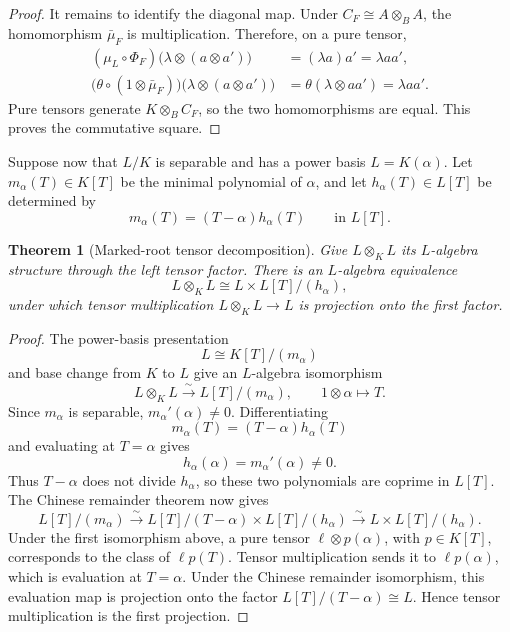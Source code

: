 \documentclass[11pt]{article}
\newtheorem{theorem}{Theorem}[section]
\theoremstyle{remark}
\theoremstyle{definition}
\begin{document}
\begin{proof}
It remains to identify the diagonal map.  Under
\(C_F\cong A\otimes_BA\), the homomorphism \(\bar\mu_F\) is
multiplication.  Therefore, on a pure tensor,
\[
  \begin{aligned}
  (\mu_L\circ\Phi_F)
    \bigl(\lambda\otimes(a\otimes a')\bigr)
    &=(\lambda a)a'
     =\lambda aa',\\
  \bigl(\theta\circ(1\otimes\bar\mu_F)\bigr)
    \bigl(\lambda\otimes(a\otimes a')\bigr)
    &=\theta(\lambda\otimes aa')
     =\lambda aa'.
  \end{aligned}
\]
Pure tensors generate \(K\otimes_BC_F\), so the two homomorphisms are
equal.  This proves the commutative square.
\end{proof}

Suppose now that \(L/K\) is separable and has a power basis
\(L=K(\alpha)\).  Let \(m_\alpha(T)\in K[T]\) be the minimal polynomial
of \(\alpha\), and let \(h_\alpha(T)\in L[T]\) be determined by
\[
  m_\alpha(T)=(T-\alpha)h_\alpha(T)
  \qquad\text{in }L[T].
\]

\begin{theorem}[Marked-root tensor decomposition]
\label{thm:marked-root-tensor-decomposition}
Give \(L\otimes_KL\) its \(L\)-algebra structure through the left tensor
factor.  There is an \(L\)-algebra equivalence
\[
  L\otimes_KL
  \cong
  L\times L[T]/(h_\alpha),
\]
under which tensor multiplication \(L\otimes_KL\to L\) is projection
onto the first factor.
\end{theorem}

\begin{proof}
The power-basis presentation
\[
  L\cong K[T]/(m_\alpha)
\]
and base change from \(K\) to \(L\) give an \(L\)-algebra isomorphism
\[
  L\otimes_KL
  \xrightarrow{\sim}
  L[T]/(m_\alpha),
  \qquad
  1\otimes\alpha\longmapsto T.
\]
Since \(m_\alpha\) is separable,
\(m_\alpha'(\alpha)\neq0\).  Differentiating
\[
  m_\alpha(T)=(T-\alpha)h_\alpha(T)
\]
and evaluating at \(T=\alpha\) gives
\[
  h_\alpha(\alpha)=m_\alpha'(\alpha)\neq0.
\]
Thus \(T-\alpha\) does not divide \(h_\alpha\), so these two polynomials
are coprime in \(L[T]\).  The Chinese remainder theorem now gives
\[
  L[T]/(m_\alpha)
  \xrightarrow{\sim}
  L[T]/(T-\alpha)\times L[T]/(h_\alpha)
  \xrightarrow{\sim}
  L\times L[T]/(h_\alpha).
\]
Under the first isomorphism above, a pure tensor
\(\ell\otimes p(\alpha)\), with \(p\in K[T]\), corresponds to the class
of \(\ell p(T)\).  Tensor multiplication sends it to
\(\ell p(\alpha)\), which is evaluation at \(T=\alpha\).  Under the
Chinese remainder isomorphism, this evaluation map is projection onto
the factor \(L[T]/(T-\alpha)\cong L\).  Hence tensor multiplication is
the first projection.
\end{proof}
\end{document}
